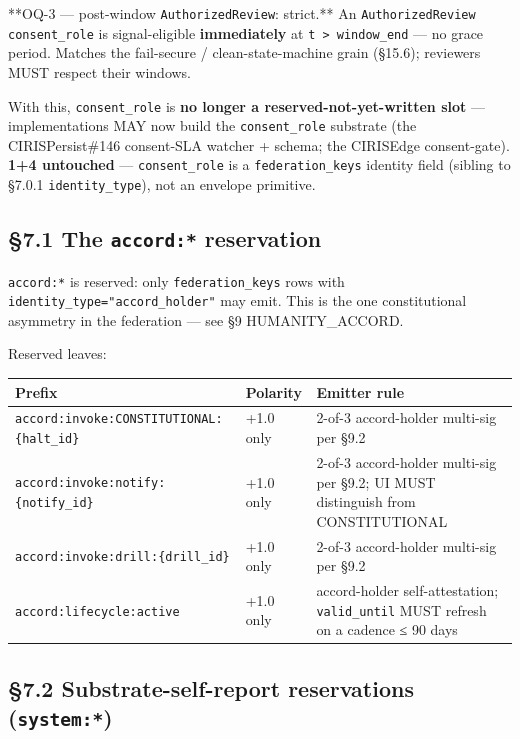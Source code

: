 \documentclass[10pt]{article}
\begin{document}
**OQ-3 — post-window \texttt{AuthorizedReview}: strict.** An \texttt{AuthorizedReview} \texttt{consent\_role} is signal-eligible \textbf{immediately} at \texttt{t > window\_end} — no grace period. Matches the fail-secure / clean-state-machine grain (§15.6); reviewers MUST respect their windows.


With this, \texttt{consent\_role} is \textbf{no longer a reserved-not-yet-written slot} — implementations MAY now build the \texttt{consent\_role} substrate (the CIRISPersist\#146 consent-SLA watcher + schema; the CIRISEdge consent-gate). \textbf{1+4 untouched} — \texttt{consent\_role} is a \texttt{federation\_keys} identity field (sibling to §7.0.1 \texttt{identity\_type}), not an envelope primitive.


\subsection*{§7.1 The \texttt{accord:*} reservation}


\texttt{accord:*} is reserved: only \texttt{federation\_keys} rows with \texttt{identity\_type="accord\_holder"} may emit. This is the one constitutional asymmetry in the federation — see §9 HUMANITY\_ACCORD.


Reserved leaves:


{\footnotesize
\begin{longtable}{|p{5.33cm}|p{5.33cm}|p{5.33cm}|}\hline
\textbf{Prefix} & \textbf{Polarity} & \textbf{Emitter rule} \\ \hline\endhead
\texttt{accord:invoke:CONSTITUTIONAL:\{halt\_id\}} & +1.0 only & 2-of-3 accord-holder multi-sig per §9.2 \\ \hline
\texttt{accord:invoke:notify:\{notify\_id\}} & +1.0 only & 2-of-3 accord-holder multi-sig per §9.2; UI MUST distinguish from CONSTITUTIONAL \\ \hline
\texttt{accord:invoke:drill:\{drill\_id\}} & +1.0 only & 2-of-3 accord-holder multi-sig per §9.2 \\ \hline
\texttt{accord:lifecycle:active} & +1.0 only & accord-holder self-attestation; \texttt{valid\_until} MUST refresh on a cadence ≤ 90 days \\ \hline
\end{longtable}}


\subsection*{§7.2 Substrate-self-report reservations (\texttt{system:*})}
\end{document}
